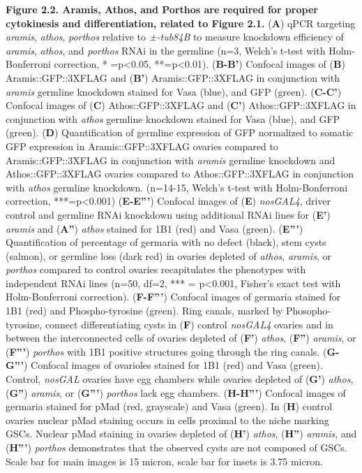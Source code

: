 \documentclass[12pt,oneside]{reedthesis}
\begin{document}
\textbf{Figure 2.2. Aramis, Athos, and Porthos are required for
proper cytokinesis and differentiation, related to Figure 2.1.} (\textbf{A})
qPCR targeting \emph{aramis}, \emph{athos}, \emph{porthos} relative to \emph{±-tub84B} to
measure knockdown efficiency of \emph{aramis}, \emph{athos}, and \emph{porthos} RNAi in
the germline (n=3, Welch's t-test with Holm-Bonferroni correction, *
=p\textless0.05, **=p\textless0.01). (\textbf{B-B'}) Confocal images of (\textbf{B})
Aramis::GFP::3XFLAG and (\textbf{B'}) Aramis::GFP::3XFLAG in conjunction with
\emph{aramis} germline knockdown stained for Vasa (blue), and GFP (green).
(\textbf{C-C'}) Confocal images of (\textbf{C}) Athos::GFP::3XFLAG and (\textbf{C'})
Athos::GFP::3XFLAG in conjunction with \emph{athos} germline knockdown
stained for Vasa (blue), and GFP (green). (\textbf{D}) Quantification of
germline expression of GFP normalized to somatic GFP expression in
Aramis::GFP::3XFLAG ovaries compared to Aramis::GFP::3XFLAG in
conjunction with \emph{aramis} germline knockdown and Athos::GFP::3XFLAG
ovaries compared to Athos::GFP::3XFLAG in conjunction with \emph{athos}
germline knockdown. (n=14-15, Welch's t-test with Holm-Bonferroni
correction, ***=p\textless0.001) (\textbf{E-E'''}) Confocal images of (\textbf{E})
\emph{nosGAL4}, driver control and germline RNAi knockdown using additional
RNAi lines for (\textbf{E'}) \emph{aramis} and (\textbf{A''}) \emph{athos} stained for 1B1
(red) and Vasa (green). (\textbf{E'''}) Quantification of percentage of
germaria with no defect (black), stem cysts (salmon), or germline loss
(dark red) in ovaries depleted of \emph{athos}, \emph{aramis}, or \emph{porthos}
compared to control ovaries recapitulates the phenotypes with
independent RNAi lines (n=50, df=2, *** = p\textless0.001, Fisher's exact
test with Holm-Bonferroni correction). (\textbf{F-F'''}) Confocal images of
germaria stained for 1B1 (red) and Phospho-tyrosine (green). Ring
canals, marked by Phosopho-tyrosine, connect differentiating cysts in
(\textbf{F}) control \emph{nosGAL4} ovaries and in between the interconnected
cells of ovaries depleted of (\textbf{F'}) \emph{athos}, (\textbf{F''}) \emph{aramis}, or
(\textbf{F'''}) \emph{porthos} with 1B1 positive structures going through the ring
canals. (\textbf{G-G'''}) Confocal images of ovarioles stained for 1B1 (red)
and Vasa (green). Control, \emph{nosGAL} ovaries have egg chambers while
ovaries depleted of (\textbf{G'}) \emph{athos}, (\textbf{G''}) \emph{aramis}, or (\textbf{G'''})
\emph{porthos} lack egg chambers. (\textbf{H-H'''}) Confocal images of germaria
stained for pMad (red, grayscale) and Vasa (green). In (\textbf{H}) control
ovaries nuclear pMad staining occurs in cells proximal to the niche
marking GSCs. Nuclear pMad staining in ovaries depleted of (\textbf{H'})
\emph{athos}, (\textbf{H''}) \emph{aramis}, and (\textbf{H'''}) \emph{porthos} demonstrates that
the observed cysts are not composed of GSCs. Scale bar for main images
is 15 micron, scale bar for insets is 3.75 micron.
\end{document}
